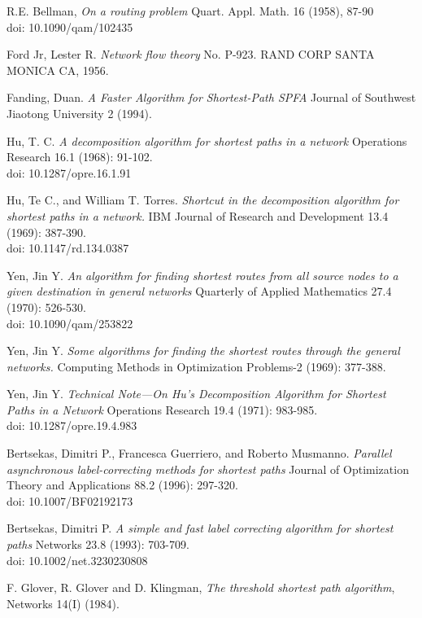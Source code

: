 \documentclass{article}
\begin{document}
\begin{thebibliography}{9}

R.E. Bellman, \textit{On a routing problem}
Quart. Appl. Math. 16 (1958), 87-90\\
doi: 10.1090/qam/102435 

Ford Jr, Lester R. \textit{Network flow theory} No. P-923. RAND CORP SANTA MONICA CA, 1956.

Fanding, Duan. \textit{A Faster Algorithm for Shortest-Path  SPFA} Journal of Southwest Jiaotong University 2 (1994).

Hu, T. C. \textit{A decomposition algorithm for shortest paths in a network} Operations Research 16.1 (1968): 91-102. \\
doi: 10.1287/opre.16.1.91

Hu, Te C., and William T. Torres. \textit{Shortcut in the decomposition algorithm for shortest paths in a network.} IBM Journal of Research and Development 13.4 (1969): 387-390.\\
doi: 10.1147/rd.134.0387
 
Yen, Jin Y. \textit{An algorithm for finding shortest routes from all source nodes to a given destination in general networks} Quarterly of Applied Mathematics 27.4 (1970): 526-530.\\
doi: 10.1090/qam/253822 

Yen, Jin Y. \textit{Some algorithms for finding the shortest routes through the general networks.} Computing Methods in Optimization Problems-2 (1969): 377-388.

Yen, Jin Y. \textit{Technical Note—On Hu's Decomposition Algorithm for Shortest Paths in a Network} Operations Research 19.4 (1971): 983-985.\\
doi: 10.1287/opre.19.4.983

Bertsekas, Dimitri P., Francesca Guerriero, and Roberto Musmanno. \textit{Parallel asynchronous label-correcting methods for shortest paths} Journal of Optimization Theory and Applications 88.2 (1996): 297-320.\\
doi: 10.1007/BF02192173

Bertsekas, Dimitri P. \textit{A simple and fast label correcting algorithm for shortest paths} Networks 23.8 (1993): 703-709.\\
doi: 10.1002/net.3230230808

F. Glover, R. Glover and D. Klingman, \textit{The threshold shortest path algorithm}, Networks 14(I)
(1984). 


\end{thebibliography}
\end{document}
